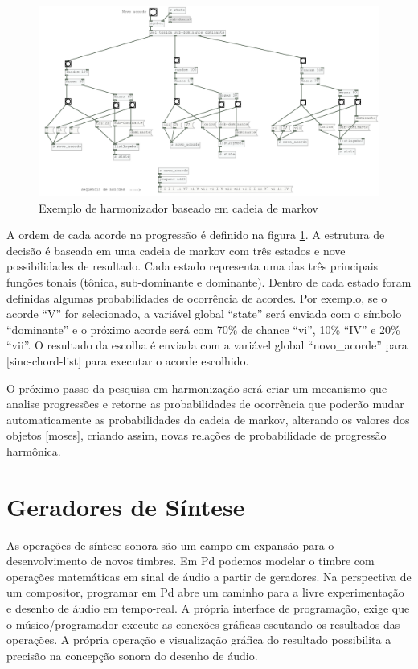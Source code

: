 \documentclass{ppgmus}
\begin{document}
\begin{figure}
\includegraphics[scale=.5]{harm-markov}
\caption{Exemplo de harmonizador baseado em cadeia de markov}
\label{harm-markov}
\end{figure}

A ordem de cada acorde na progressão é definido na figura \ref{harm-markov}.
A estrutura de decisão é baseada em uma cadeia de markov com três estados e 
nove possibilidades de resultado. Cada estado representa uma das três principais
funções tonais (tônica, sub-dominante e dominante). Dentro de cada estado foram definidas
algumas probabilidades de ocorrência de acordes. Por exemplo, se o acorde ``V'' 
for selecionado, a variável global ``state'' será enviada com o símbolo ``dominante'' e o próximo
acorde será com 70\% de chance ``vi'', 10\% ``IV'' e 20\% ``vii''. O resultado da escolha 
é enviada com a variável global ``novo\_acorde'' para [sinc-chord-list] para executar o
acorde escolhido.

O próximo passo da pesquisa em harmonização será criar um mecanismo que analise progressões
 e retorne as probabilidades de ocorrência que poderão mudar automaticamente as probabilidades
da cadeia de markov, alterando os valores dos objetos [moses], criando assim, novas relações
de probabilidade de progressão harmônica.

\pagebreak

\section{Geradores de Síntese}

As operações de síntese sonora são um campo em expansão para o
desenvolvimento de novos timbres. Em Pd podemos modelar
o timbre com operações matemáticas em sinal de
áudio a partir de geradores.
Na perspectiva de um compositor, programar em Pd abre um caminho
 para a livre experimentação e desenho
de áudio em tempo-real. A própria interface de
programação, exige que o músico/programador execute as 
conexões gráficas escutando os resultados das operações.
 A própria operação e visualização gráfica 
do resultado possibilita a precisão na concepção sonora do desenho
de áudio. 
\end{document}
